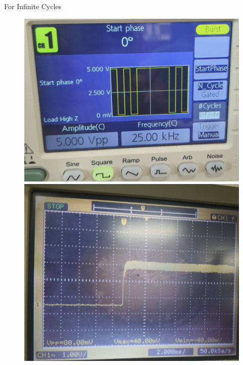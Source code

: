 \documentclass[12pt,a4paper]{report}
\begin{document}
\begin{itemize}
\begin{figure}[H]
\begin{minipage}[c]{0.48\textwidth}
    \end{minipage}
    
\end{figure}
For Infinite Cycles
\begin{figure}[H] %
    \centering
    \begin{minipage}[c]{0.48\textwidth}
        \includegraphics[width=\textwidth]{figs/t3_2.jpg} %
        
    \end{minipage}
    \hfill
    \begin{minipage}[c]{0.48\textwidth}
        \includegraphics[width=\textwidth]{figs/tr3_2.jpg} %
        

\end{minipage}
\end{figure}
\end{itemize}
\end{document}

